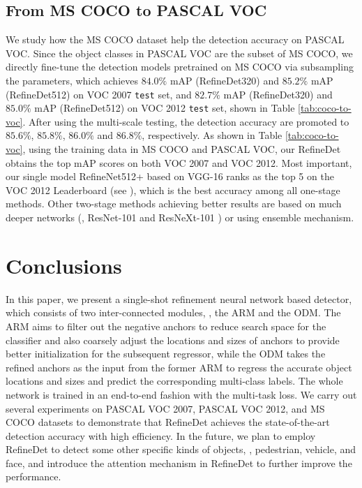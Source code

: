 \documentclass[10pt,twocolumn,letterpaper]{article}
\begin{document}
\subsection{From MS COCO to PASCAL VOC}
We study how the MS COCO dataset help the detection accuracy on PASCAL VOC. Since the object classes in PASCAL VOC are the subset of MS COCO, we directly fine-tune the detection models pretrained on MS COCO via subsampling the parameters, which achieves $84.0\%$ mAP (RefineDet320) and $85.2\%$ mAP (RefineDet512) on VOC 2007 {\tt test} set, and $82.7\%$ mAP (RefineDet320) and $85.0\%$ mAP (RefineDet512) on VOC 2012 {\tt test} set, shown in Table \ref{tab:coco-to-voc}. After using the multi-scale testing, the detection accuracy are promoted to $85.6\%$, $85.8\%$, $86.0\%$ and $86.8\%$, respectively. As shown in Table \ref{tab:coco-to-voc}, using the training data in MS COCO and PASCAL VOC, our RefineDet obtains the top mAP scores on both VOC 2007 and VOC 2012. Most important, our single model RefineNet512+ based on VGG-16 ranks as the top 5 on the VOC 2012 Leaderboard (see \cite{voc2012-leaderboard}), which is the best accuracy among all one-stage methods. Other two-stage methods achieving better results are based on much deeper networks (\eg, ResNet-101 \cite{DBLP:conf/cvpr/HeZRS16} and ResNeXt-101 \cite{DBLP:journals/corr/XieGDTH16}) or using ensemble mechanism.

\section{Conclusions}
In this paper, we present a single-shot refinement neural network based detector, which consists of two inter-connected modules, \ie, the ARM and the ODM. The ARM aims to filter out the negative anchors to reduce search space for the classifier and also coarsely adjust the locations and sizes of anchors to provide better initialization for the subsequent regressor, while the ODM takes the refined anchors as the input from the former ARM to regress the accurate object locations and sizes and predict the corresponding multi-class labels. The whole network is trained in an end-to-end fashion with the multi-task loss. We carry out several experiments on PASCAL VOC 2007, PASCAL VOC 2012, and MS COCO datasets to demonstrate that RefineDet achieves the state-of-the-art detection accuracy with high efficiency. In the future, we plan to employ RefineDet to detect some other specific kinds of objects, \eg, pedestrian, vehicle, and face, and introduce the attention mechanism in RefineDet to further improve the performance.
\end{document}
